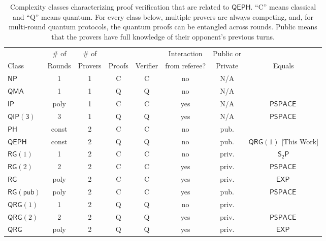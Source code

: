 \documentclass[11pt]{article}
\theoremstyle{definition}
\newcommand{\class}[1]{\ensuremath{\mathsf{#1}}\xspace}
\newcommand{\NP}{\class{NP}}
\newcommand{\EXP}{\class{EXP}}
\newcommand{\IP}{\class{IP}}
\newcommand{\PSPACE}{\class{PSPACE}}
\newcommand{\QMA}{\class{QMA}}
\newcommand{\QIP}{\class{QIP}}
\newcommand{\QRG}{\class{QRG}}
\newcommand{\QRGk}[1][k]{\class{QRG(#1)}}
\newcommand{\QRGone}{\QRGk[1]}
\newcommand{\RG}{\class{RG}}
\newcommand{\PH}{\class{PH}}
\newcommand{\QEPH}{\class{QEPH}}
\begin{document}
\begin{table}[ht]
    \centering
    \caption{Complexity classes characterizing proof verification that are related to $\QEPH$. ``C'' means classical and ``Q'' means quantum. For every class below, multiple provers are always competing, and, for multi-round quantum protocols, the quantum proofs can be entangled across rounds. Public means that the provers have full knowledge of their opponent's previous turns.}
    \label{table:classes}
    \begin{tabular}
    {
        l
        S[table-format = 2]
        S[table-format = 2]
        S[table-format = 2]
        S[table-format = 2]
        S[table-format = 2]
        S[table-format = 2]
        S[table-format = 2]
        }
        \toprule
              & {\# of } & {\# of}   & {}       & {}         & {Interaction}            & {Public or}      &  {} \\
        Class & {Rounds} & {Provers} & {Proofs} & {Verifier} & {from referee?} & {Private} & {Equals} \\
        \midrule
        {$\NP$} & {1} & {1} & {C} & {C} & {no} & {N/A} & {} \\
        {$\QMA$} & {1} & {1} & {Q} & {Q} & {no} & {N/A} & {} \\
        {$\IP$} & {poly} & {1} & {C} &{C} & {yes} & {N/A} & {$\PSPACE\,$ \cite{shamir1992ip}} \\
        {$\QIP\mathsf{(3)}$} & {3} & {1} & {Q} &{Q} & {yes} & {N/A} & {$\PSPACE\,$\cite{jain2011qip}} \\
        \midrule 
        {$\PH$} & {const} & {2} & {C} & {C} & {no} & {pub.} & {} \\
        {$\QEPH$} & {const} & {2} & {Q} & {Q} & {no} & {pub.} & {$\QRGone$ [This Work]} \\
        {$\RG(1)$} & {1} & {2} & {C} &{C} & {no} & {priv.} & {$\mathsf{S_2P}$\cite{ALTHOFER1994339,lipton1994simple}} \\
        {$\RG(2)$} & {2} & {2} & {C} &{C} & {yes} & {priv.} & {$\PSPACE\,$\cite{feige1997making}} \\
        {$\RG$} & {poly} & {2} & {C} &{C} & {yes} & {priv.} & {$\EXP\,$\cite{feige1997making}} \\
        {$\RG\mathsf{(pub)}$} & {poly} & {2} & {C} &{C} & {yes} & {pub.} & {$\PSPACE\,$\cite{feige1997making}} \\
        {$\QRG(1)$} & {1} & {2} & {Q} &{Q} & {no} & {priv.} &  \\
        {$\QRG(2)$} & {2} & {2} & {Q} &{Q} & {yes} & {priv.} & {$\PSPACE\,$\cite{gutoski2013parallel}} \\
        {$\QRG$} & {poly} & {2} & {Q} &{Q} & {yes} & {priv.} & {$\EXP\,$\cite{gutoski2007toward}} \\
        \bottomrule
    \end{tabular}
\end{table}
\end{document}
